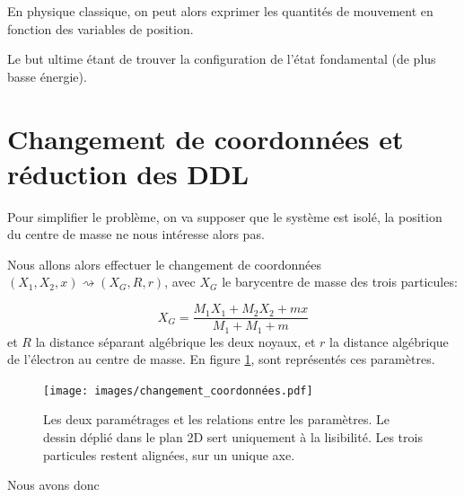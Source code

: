 \documentclass[svgnames,dvipsnames,a4paper,10pt,french]{report}
\begin{document}
En physique classique, on peut alors exprimer les quantités de mouvement en fonction des variables de position.

Le but ultime étant de trouver la configuration de l'état fondamental (de plus basse énergie).


\section{Changement de coordonnées et réduction des DDL}



Pour simplifier le problème, on va supposer que le système est isolé, la position du centre de masse ne nous intéresse alors pas.

Nous allons alors effectuer le changement de coordonnées $(X_1,X_2,x) \rightsquigarrow (X_G, R, r)$, avec $X_G$ le barycentre de masse des trois particules:

\begin{equation}
    X_G = \frac{M_1 X_1 + M_2 X_2 + mx}{M_1 + M_1 + m }
\end{equation}
et $R$ la distance séparant algébrique les deux noyaux, et $r$ la distance algébrique de l'électron au centre de masse. En figure \ref{fig:chgt_coord}, sont représentés ces paramètres.


\begin{figure}[H]
    \centering
    \texttt{[image: images/changement\_coordonnées.pdf]}
    \caption[Paramétrage et notations pour  le changement de coordonnées]{Les deux paramétrages et les relations entre les paramètres. Le dessin \og déplié \fg{} dans le plan 2D sert uniquement à la lisibilité. Les trois particules restent alignées, sur un unique axe.}
    \label{fig:chgt_coord}
\end{figure}

Nous avons donc
\end{document}
